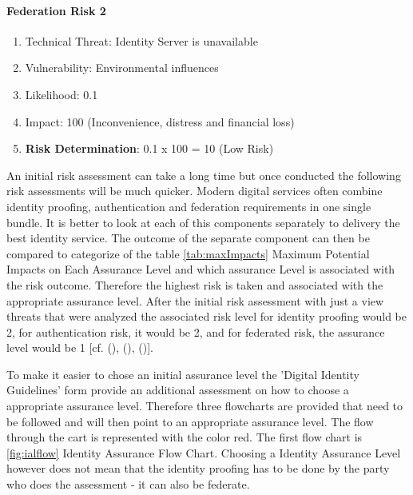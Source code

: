 \paragraph{Federation Risk 2 }
\begin{enumerate}
	\item Technical Threat: Identity Server is unavailable
	\item Vulnerability: Environmental influences 
	\item Likelihood: 0.1
	\item Impact: 100 (Inconvenience, distress and financial loss)
	\item \textbf{Risk Determination}: 0.1 x 100 = 10 (Low Risk)
\end{enumerate}


An initial risk assessment can take a long time but once conducted the following risk assessments will be much quicker. Modern digital services often combine identity proofing, authentication and federation requirements in one single bundle. It is better to look at each of this components separately to delivery the best identity service. The outcome of the separate component can then be compared to categorize of the table \ref{tab:maxImpacts} Maximum Potential Impacts on Each Assurance Level and which assurance Level is associated with the risk outcome. Therefore the highest risk is taken and associated with the appropriate assurance level. After the initial risk assessment with just a view threats that were analyzed the associated risk level for identity proofing would be 2, for authentication risk, it would be 2, and for federated risk, the assurance level would be 1 [cf. (\cite{NIST:2017:DIG}), (\cite{NIST:2018:RMF}), (\cite{Hudson:2015:SecurityRisk})].

To make it easier to chose an initial assurance level the 'Digital Identity Guidelines' form \cite{NIST:2017:DIG} provide an additional assessment on how to choose a appropriate assurance level. Therefore three flowcharts are provided that need to be followed and will then point to an appropriate assurance level. The flow through the cart is represented with the color red. The first flow chart is \ref{fig:ialflow} Identity Assurance Flow Chart. Choosing a Identity Assurance Level however does not mean that the identity proofing has to be done by the party who does the assessment - it can also be federate. 

